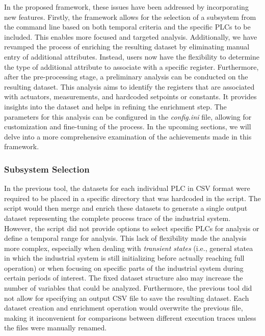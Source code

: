 \bigskip
In the proposed framework, these issues have been addressed by incorporating new features. Firstly, the framework allows for the selection of a subsystem from the command line based on both temporal criteria and the specific PLCs to be included. This enables more focused and targeted analysis. Additionally, we have revamped the process of enriching the resulting dataset by eliminating manual entry of additional attributes. Instead, users now have the flexibility to determine the type of additional attribute to associate with a specific register.\newline
Furthermore, after the pre-processing stage, a preliminary analysis can be conducted on the resulting dataset. This analysis aims to identify the registers that are associated with actuators, measurements, and hardcoded setpoints or constants. It provides insights into the dataset and helps in refining the enrichment step. The parameters for this analysis can be configured in the \textit{config.ini} file, allowing for customization and fine-tuning of the process.\newline \newline 
In the upcoming sections, we will delve into a more comprehensive examination of the achievements made in this framework.
\vfill

\subsubsection{Subsystem Selection}
\label{subsubsec:4_select_subsystem}

In the previous tool, the datasets for each individual PLC in CSV format were required to be placed in a specific directory that was hardcoded in the script. The script would then merge and enrich these datasets to generate a single output dataset representing the complete process trace of the industrial system. However, the script did not provide options to select specific PLCs for analysis or define a temporal range for analysis. This lack of flexibility made the analysis more complex, especially when dealing with \textit{transient states} (i.e., general statea in which the industrial system is still initializing before actually reaching full operation) or when focusing on specific parts of the industrial system during certain periods of interest. The fixed dataset structure also may increase the number of variables that could be analyzed.\newline
Furthermore, the previous tool did not allow for specifying an output CSV file to save the resulting dataset. Each dataset creation and enrichment operation would overwrite the previous file, making it inconvenient for comparisons between different execution traces unless the files were manually renamed.

